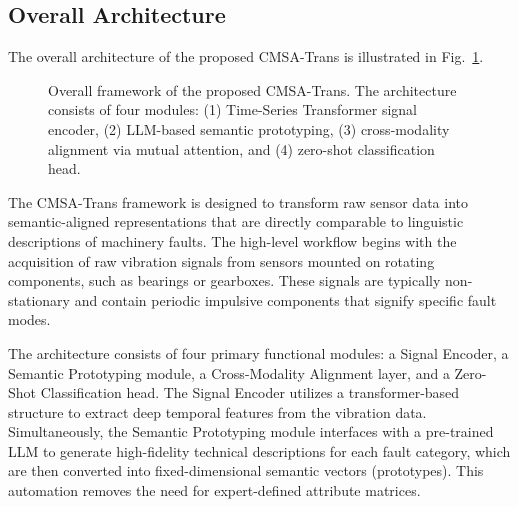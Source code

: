 \documentclass[journal]{IEEEtran}
\begin{document}
\subsection{Overall Architecture}
The overall architecture of the proposed CMSA-Trans is illustrated in Fig.~\ref{fig:framework}.

\begin{figure}[!t]
\centering
{}
\caption{Overall framework of the proposed CMSA-Trans. The architecture consists of four modules: (1) Time-Series Transformer signal encoder, (2) LLM-based semantic prototyping, (3) cross-modality alignment via mutual attention, and (4) zero-shot classification head.}
\label{fig:framework}
\end{figure}

The CMSA-Trans framework is designed to transform raw sensor data into semantic-aligned representations that are directly comparable to linguistic descriptions of machinery faults. The high-level workflow begins with the acquisition of raw vibration signals from sensors mounted on rotating components, such as bearings or gearboxes. These signals are typically non-stationary and contain periodic impulsive components that signify specific fault modes.

The architecture consists of four primary functional modules: a Signal Encoder, a Semantic Prototyping module, a Cross-Modality Alignment layer, and a Zero-Shot Classification head. The Signal Encoder utilizes a transformer-based structure \cite{vaswani2017attention, zerveas2021transformer} to extract deep temporal features from the vibration data. Simultaneously, the Semantic Prototyping module interfaces with a pre-trained LLM \cite{radford2021learning} to generate high-fidelity technical descriptions for each fault category, which are then converted into fixed-dimensional semantic vectors (prototypes). This automation removes the need for expert-defined attribute matrices.
\end{document}
